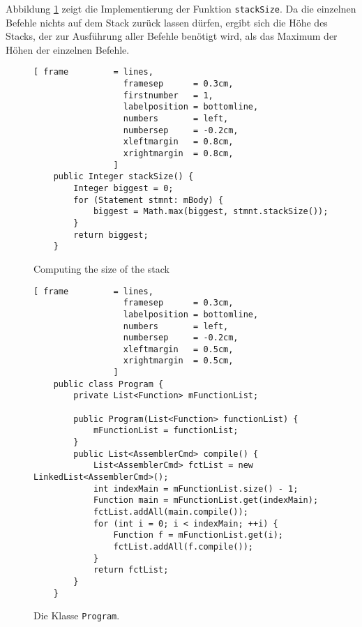 Abbildung \ref{fig:Compiler:Function.stackSize} zeigt die Implementierung der Funktion
\texttt{stackSize}. Da die einzelnen Befehle nichts auf dem Stack zur\"uck lassen d\"urfen, ergibt sich
die H\"ohe des Stacks, der zur Ausf\"uhrung aller Befehle ben\"otigt wird, als das Maximum der H\"ohen der
einzelnen Befehle.


\begin{figure}[!ht]
\centering
\begin{Verbatim}[ frame         = lines, 
                  framesep      = 0.3cm, 
                  firstnumber   = 1,
                  labelposition = bottomline,
                  numbers       = left,
                  numbersep     = -0.2cm,
                  xleftmargin   = 0.8cm,
                  xrightmargin  = 0.8cm,
                ]
    public Integer stackSize() {
        Integer biggest = 0;
        for (Statement stmnt: mBody) {
            biggest = Math.max(biggest, stmnt.stackSize());
        }
        return biggest;
    }    
\end{Verbatim}
\vspace*{-0.3cm}
\caption{Computing the size of the stack}
\label{fig:Compiler:Function.stackSize}
\end{figure}


\begin{figure}[!ht]
\centering
\begin{Verbatim}[ frame         = lines, 
                  framesep      = 0.3cm, 
                  labelposition = bottomline,
                  numbers       = left,
                  numbersep     = -0.2cm,
                  xleftmargin   = 0.5cm,
                  xrightmargin  = 0.5cm,
                ]    
    public class Program {
        private List<Function> mFunctionList;
    
        public Program(List<Function> functionList) {
            mFunctionList = functionList;
        }
        public List<AssemblerCmd> compile() {
            List<AssemblerCmd> fctList = new LinkedList<AssemblerCmd>();
            int indexMain = mFunctionList.size() - 1;
            Function main = mFunctionList.get(indexMain);
            fctList.addAll(main.compile());
            for (int i = 0; i < indexMain; ++i) {
                Function f = mFunctionList.get(i);
                fctList.addAll(f.compile());
            }
            return fctList;
        }
    }
\end{Verbatim}
\vspace*{-0.3cm}
\caption{Die Klasse \texttt{Program}.}
\label{fig:Program.java}
\end{figure}
 
